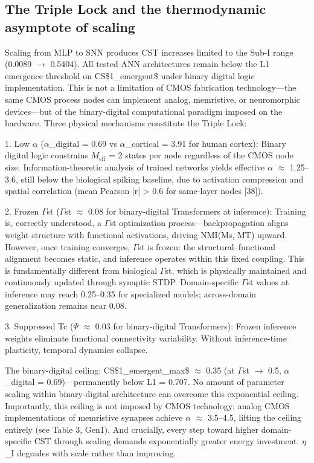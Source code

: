 \documentclass[a4paper,12pt]{article}
\begin{document}
\subsection{The Triple Lock and the thermodynamic asymptote of scaling}

Scaling from MLP to SNN produces CST increases limited to the Sub-I range (0.0089 $\rightarrow$ 0.5404). All tested ANN architectures remain below the L1 emergence threshold on CS\$1_{emergent}\$ under binary digital logic implementation. This is not a limitation of CMOS fabrication technology---the same CMOS process nodes can implement analog, memristive, or neuromorphic devices---but of the binary-digital computational paradigm imposed on the hardware. Three physical mechanisms constitute the Triple Lock:


1. Low $\alpha$ ($\alpha$_digital = 0.69 vs $\alpha$_cortical = 3.91 for human cortex): Binary digital logic constrains $M_{\text{eff}}$ = 2 states per node regardless of the CMOS node size. Information-theoretic analysis of trained networks yields effective $\alpha$ $\approx$ 1.25--3.6, still below the biological spiking baseline, due to activation compression and spatial correlation (mean Pearson |r| > 0.6 for same-layer nodes [38]).


2. Frozen $\Gamma$st ($\Gamma$st $\approx$ 0.08 for binary-digital Transformers at inference): Training is, correctly understood, a $\Gamma$st optimization process---backpropagation aligns weight structure with functional activations, driving NMI(Ms, MT) upward. However, once training converges, $\Gamma$st is frozen: the structural--functional alignment becomes static, and inference operates within this fixed coupling. This is fundamentally different from biological $\Gamma$st, which is physically maintained and continuously updated through synaptic STDP. Domain-specific $\Gamma$st values at inference may reach 0.25--0.35 for specialized models; across-domain generalization remains near 0.08.


3. Suppressed Tc ($\Psi$ $\approx$ 0.03 for binary-digital Transformers): Frozen inference weights eliminate functional connectivity variability. Without inference-time plasticity, temporal dynamics collapse.


The binary-digital ceiling: CS\$1_{emergent_max}\$ $\approx$ 0.35 (at $\Gamma$st $\rightarrow$ 0.5, $\alpha$_digital = 0.69)—permanently below L1 = 0.707. No amount of parameter scaling within binary-digital architecture can overcome this exponential ceiling. Importantly, this ceiling is not imposed by CMOS technology; analog CMOS implementations of memristive synapses achieve $\alpha$ $\approx$ 3.5–4.5, lifting the ceiling entirely (see Table 3, Gen1). And crucially, every step toward higher domain-specific CST through scaling demands exponentially greater energy investment: $\eta$_I degrades with scale rather than improving.
\end{document}
